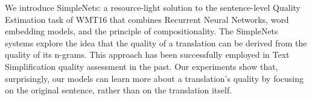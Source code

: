 We introduce SimpleNets: a resource-light solution to the sentence-level Quality Estimation task of WMT16 that combines Recurrent Neural Networks, word embedding models, and the principle of compositionality. The SimpleNets systems explore the idea that the quality of a translation can be derived from the quality of its n-grams. This approach has been successfully employed in Text Simplification quality assessment in the past. Our experiments show that, surprisingly, our models can learn more about a translation's quality by focusing on the original sentence, rather than on the translation itself.
